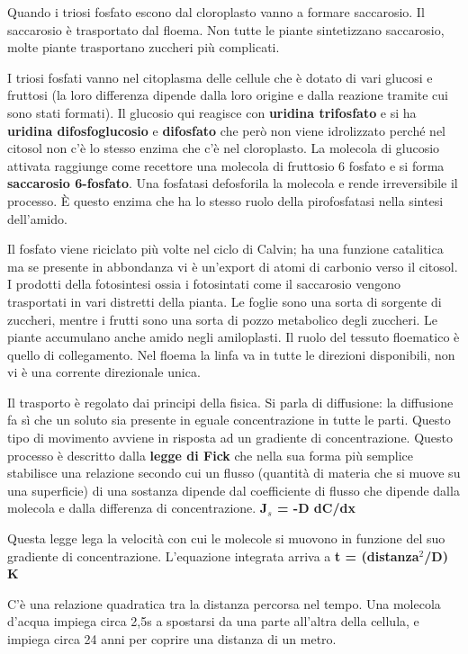 \documentclass[]{article}
\begin{document}
Quando i triosi fosfato escono dal cloroplasto vanno a formare
saccarosio. Il saccarosio è trasportato dal floema. Non tutte le piante
sintetizzano saccarosio, molte piante trasportano zuccheri più
complicati.

I triosi fosfati vanno nel citoplasma delle cellule che è dotato di vari
glucosi e fruttosi (la loro differenza dipende dalla loro origine e
dalla reazione tramite cui sono stati formati). Il glucosio qui reagisce
con \textbf{uridina trifosfato} e si ha \textbf{uridina difosfoglucosio}
e \textbf{difosfato} che però non viene idrolizzato perché nel citosol
non c'è lo stesso enzima che c'è nel cloroplasto. La molecola di
glucosio attivata raggiunge come recettore una molecola di fruttosio 6
fosfato e si forma \textbf{saccarosio 6-fosfato}. Una fosfatasi
defosforila la molecola e rende irreversibile il processo. È questo
enzima che ha lo stesso ruolo della pirofosfatasi nella sintesi
dell'amido.

Il fosfato viene riciclato più volte nel ciclo di Calvin; ha una
funzione catalitica ma se presente in abbondanza vi è un'export di atomi
di carbonio verso il citosol. I prodotti della fotosintesi ossia i
fotosintati come il saccarosio vengono trasportati in vari distretti
della pianta. Le foglie sono una sorta di sorgente di zuccheri, mentre i
frutti sono una sorta di pozzo metabolico degli zuccheri. Le piante
accumulano anche amido negli amiloplasti. Il ruolo del tessuto
floematico è quello di collegamento. Nel floema la linfa va in tutte le
direzioni disponibili, non vi è una corrente direzionale unica.

Il trasporto è regolato dai principi della fisica. Si parla di
diffusione: la diffusione fa sì che un soluto sia presente in eguale
concentrazione in tutte le parti. Questo tipo di movimento avviene in
risposta ad un gradiente di concentrazione. Questo processo è descritto
dalla \textbf{legge di Fick} che nella sua forma più semplice stabilisce
una relazione secondo cui un flusso (quantità di materia che si muove su
una superficie) di una sostanza dipende dal coefficiente di flusso che
dipende dalla molecola e dalla differenza di concentrazione.
\textbf{J$_s$ = -D dC/dx}

Questa legge lega la velocità con cui le molecole si muovono in funzione
del suo gradiente di concentrazione. L'equazione integrata arriva a
\textbf{t = (distanza$^2$/D) K}

C'è una relazione quadratica tra la distanza percorsa nel tempo. Una
molecola d'acqua impiega circa 2,5s a spostarsi da una parte all'altra
della cellula, e impiega circa 24 anni per coprire una distanza di un
metro.
\end{document}
